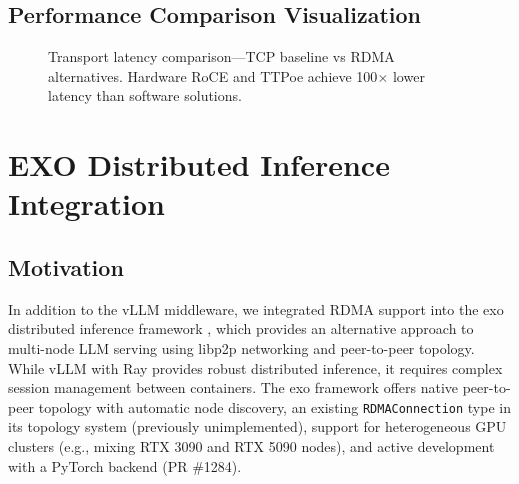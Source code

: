 \documentclass[10pt,letterpaper]{article}
\begin{document}
\subsection{Performance Comparison Visualization}

\begin{figure}[H]
\centering
{}
\caption{Transport latency comparison---TCP baseline vs RDMA alternatives. Hardware RoCE and TTPoe achieve 100$\times$ lower latency than software solutions.}
\end{figure}

\section{EXO Distributed Inference Integration}

\subsection{Motivation}

In addition to the vLLM middleware, we integrated RDMA support into the exo distributed inference framework \cite{exo-github}, which provides an alternative approach to multi-node LLM serving using libp2p networking and peer-to-peer topology. While vLLM with Ray provides robust distributed inference, it requires complex session management between containers. The exo framework offers native peer-to-peer topology with automatic node discovery, an existing \texttt{RDMAConnection} type in its topology system (previously unimplemented), support for heterogeneous GPU clusters (e.g., mixing RTX 3090 and RTX 5090 nodes), and active development with a PyTorch backend (PR \#1284).
\end{document}
